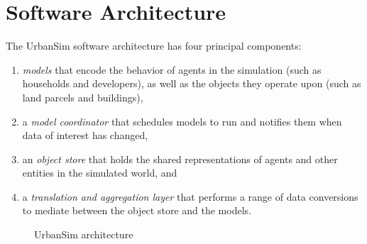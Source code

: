 \documentclass[fleqn]{article}
\begin{document}
\section{Software Architecture}
\label{sec:overview}

The UrbanSim software architecture has four principal components:

\begin{enumerate}

\item \emph{models} that encode the behavior of agents in the
simulation (such as households and developers), as well as the objects they
operate upon (such as land parcels and buildings),

\item a \emph{model coordinator} that schedules models to run and notifies
them when data of interest has changed,

\item an \emph{object store} that holds the shared representations of agents and other
entities in the simulated world, and

\item a \emph{translation and aggregation layer} that performs a
range of data conversions to mediate between the object store and
the models.

\end{enumerate}

\begin{figure}
\center {} \caption{UrbanSim
architecture} \label{urbansim-architecture}
\end{figure}
\end{document}
